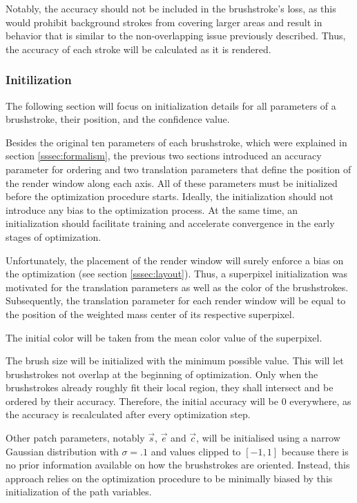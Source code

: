 Notably, the accuracy should not be included in the brushstroke's loss, as this would prohibit background strokes from covering larger areas and result in behavior that is similar to the non-overlapping issue previously described.
Thus, the accuracy of each stroke will be calculated as it is rendered.


\subsubsection{Initilization}

The following section will focus on initialization details for all parameters of a brushstroke, their position, and the confidence value.

Besides the original ten parameters of each brushstroke, which were explained in section \ref{sssec:formalism}, the previous two sections introduced an accuracy parameter for ordering and two translation parameters that define the position of the render window along each axis.
All of these parameters must be initialized before the optimization procedure starts.
Ideally, the initialization should not introduce any bias to the optimization process.
At the same time, an initialization should facilitate training and accelerate convergence in the early stages of optimization.

Unfortunately, the placement of the render window will surely enforce a bias on the optimization (see section \ref{sssec:layout}).
Thus, a superpixel initialization was motivated for the translation parameters as well as the color of the brushstrokes.
Subsequently, the translation parameter for each render window will be equal to the position of the weighted mass center of its respective superpixel.

The initial color will be taken from the mean color value of the superpixel.

The brush size will be initialized with the minimum possible value.
This will let brushstrokes not overlap at the beginning of optimization.
Only when the brushstrokes already roughly fit their local region, they shall intersect and be ordered by their accuracy.
Therefore, the initial accuracy will be 0 everywhere, as the accuracy is recalculated after every optimization step.

Other patch parameters, notably $\vec{s}$, $\vec{e}$ and $\vec{c}$, will be initialised using a narrow Gaussian distribution with $\sigma = .1$ and values clipped to $[-1, 1]$ because there is no prior information available on how the brushstrokes are oriented.
Instead, this approach relies on the optimization procedure to be minimally biased by this initialization of the path variables.

